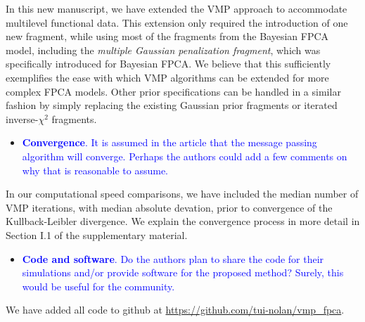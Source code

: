 \documentclass[12pt]{article}
\theoremstyle{plain}
\theoremstyle{definition}
\theoremstyle{remark}
\begin{document}
\vspace{1\baselineskip}

In this new manuscript, we have extended the VMP approach to accommodate multilevel functional data. This extension
only required the introduction of one new fragment, while using most of the fragments from the Bayesian FPCA model,
including the \emph{multiple Gaussian penalization fragment}, which was specifically introduced for Bayesian FPCA.
We believe that this sufficiently exemplifies the ease with which VMP algorithms can be extended for more complex
FPCA models. Other prior specifications can be handled in a similar fashion by simply replacing the existing
Gaussian prior fragments or iterated inverse-$\chi^2$ fragments.

\vspace{2\baselineskip}

\begin{itemize}
	\item[\textcolor{blue}{\textbullet}] \textcolor{blue}{
		\textbf{Convergence}. It is assumed in the article that the message passing algorithm will converge.
		Perhaps the authors could add a few comments on why that is reasonable to assume.
	}
\end{itemize}

\vspace{1\baselineskip}

In our computational speed comparisons, we have included the median number of VMP iterations, with median absolute devation,
prior to convergence of the Kullback-Leibler divergence. We explain the convergence process in more detail in Section I.1 of the
supplementary material.

\vspace{2\baselineskip}

\begin{itemize}
	\item[\textcolor{blue}{\textbullet}] \textcolor{blue}{
		\textbf{Code and software}. Do the authors plan to share the code for their simulations and/or provide software for
		the proposed method? Surely, this would be useful for the community.
	}
\end{itemize}

\vspace{1\baselineskip}

We have added all code to github at \url{https://github.com/tui-nolan/vmp_fpca}.

\vspace{2\baselineskip}
\end{document}
